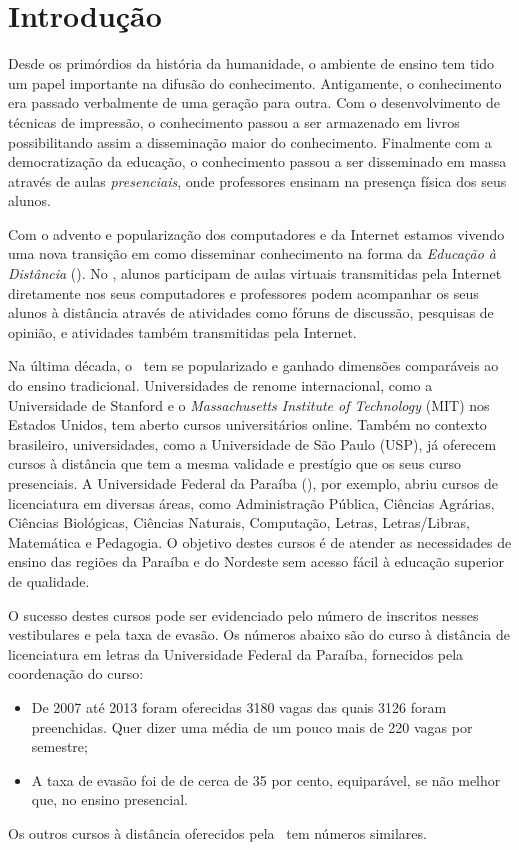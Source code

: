 \chapter{Introdução}

Desde os primórdios da história da humanidade, o ambiente de ensino tem tido um papel
importante na difusão do conhecimento. Antigamente, o conhecimento era passado
verbalmente de uma geração para outra. Com o desenvolvimento de técnicas de
impressão, o conhecimento
passou a ser armazenado em livros possibilitando assim a disseminação maior do conhecimento. 
Finalmente com a democratização da educação, o conhecimento passou a ser disseminado em massa 
através de aulas \emph{presenciais}, onde professores ensinam na presença física dos seus alunos. 

Com o advento e popularização dos computadores e da Internet 
estamos vivendo uma nova transição em como disseminar conhecimento na forma da \emph{Educação à Distância} (\ead). 
No \ead, alunos participam de aulas virtuais transmitidas pela Internet
diretamente nos seus computadores
e professores podem acompanhar os seus alunos à distância através de atividades como 
fóruns de discussão, pesquisas de opinião, e atividades também transmitidas
pela Internet.

Na última década, o \ead\ tem se popularizado e ganhado dimensões comparáveis ao do ensino  
tradicional. Universidades de renome internacional, como a Universidade de Stanford e o \emph{Massachusetts Institute of 
Technology} (MIT) nos Estados Unidos, tem aberto cursos universitários online. Também no contexto brasileiro, 
universidades, como a Universidade de São Paulo (USP), já oferecem cursos 
à distância que tem a mesma validade e prestígio que os seus curso presenciais. 
A Universidade Federal da Paraíba (\ufpb), por exemplo, abriu cursos de licenciatura em 
diversas áreas, como Administração Pública, Ciências Agrárias, Ciências Biológicas, Ciências Naturais,
Computação, Letras, Letras/Libras, Matemática e Pedagogia. O objetivo destes cursos
é de atender as necessidades de ensino das regiões da Paraíba e do Nordeste sem acesso fácil
à educação superior de qualidade. 

O sucesso destes cursos pode ser evidenciado pelo número de inscritos nesses vestibulares e pela taxa de 
evasão. Os números abaixo são do curso à distância de licenciatura em letras da Universidade Federal da Paraíba, fornecidos pela 
coordenação do curso:
\begin{itemize}
 \item De 2007 até 2013 foram oferecidas 3180 vagas das quais 3126 foram preenchidas. 
 Quer dizer uma média de um pouco mais de 220 vagas por semestre;
 
 \item A taxa de evasão  foi de de cerca de 
35 por cento, equiparável, se não melhor que, no ensino presencial.
\end{itemize}
 Os outros cursos à distância oferecidos pela \ufpb\  tem números similares.

